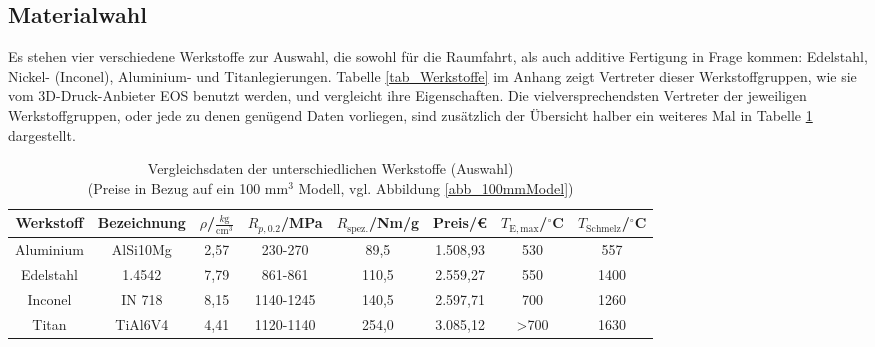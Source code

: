 \subsection{Materialwahl}
Es stehen vier verschiedene Werkstoffe zur Auswahl, die sowohl für die Raumfahrt, als auch additive Fertigung in Frage kommen: Edelstahl, Nickel- (Inconel), Aluminium- und Titanlegierungen. Tabelle \ref{tab_Werkstoffe} im Anhang zeigt Vertreter dieser Werkstoffgruppen, wie sie vom 3D-Druck-Anbieter EOS benutzt werden, und vergleicht ihre Eigenschaften. Die vielversprechendsten Vertreter der jeweiligen Werkstoffgruppen, oder jede zu denen genügend Daten vorliegen, sind zusätzlich der Übersicht halber ein weiteres Mal in Tabelle \ref{tab_WerkstoffeKlein} dargestellt.
\begin{table}[h] 
	\centering 
	\begin{tabular}{c|c|c|c|c|c|c|c} 
		Werkstoff&Bezeichnung&$\rho$/$\frac{k\mathrm{g}}{\mathrm{cm}^3}$&$R_{p,0.2}$/MPa&$R_\mathrm{spez.}$/Nm/g&Preis/€&$T_\mathrm{E, max}$/$^\circ$C&$T_\mathrm{Schmelz}$/$^\circ$C\\ 
		\hline 
		Aluminium&AlSi10Mg&2,57&230-270&89,5&1.508,93&530&557\\ 
		Edelstahl&1.4542&7,79&861-861&110,5&2.559,27&550&1400\\ 
		Inconel&IN 718&8,15&1140-1245&140,5&2.597,71&700&1260\\ 
		Titan&TiAl6V4&4,41&1120-1140&254,0&3.085,12&>700&1630\\ 
	\end{tabular} 
	\begin{flushright} 
	\end{flushright} 
	\caption{Vergleichsdaten der unterschiedlichen Werkstoffe (Auswahl) \\ (Preise in Bezug auf ein 100 mm$^3$ Modell, vgl. Abbildung \ref{abb_100mmModel})}
	\label{tab_WerkstoffeKlein}
\end{table} \\
